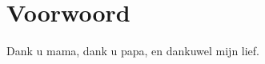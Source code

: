 \documentclass[main_adjusted]{subfiles}
\begin{document}
\chapter*{Voorwoord}
\label{cha:voorwoord}
Dank u mama, dank u papa, en dankuwel mijn lief.
\end{document}
